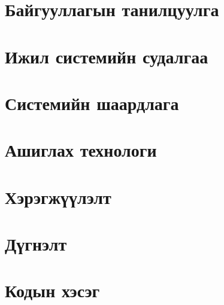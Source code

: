 
\chapter{Байгууллагын танилцуулга}


\chapter{Ижил системийн судалгаа}


\chapter{Системийн шаардлага}


\chapter{Ашиглах технологи}


% 

\chapter{Хэрэгжүүлэлт}


\chapter{Дүгнэлт}


\chapter{Кодын хэсэг}

